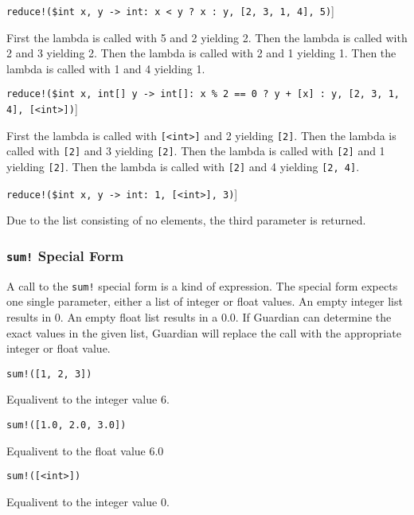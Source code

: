 {{\begin{itemize}
{			\item[] \texttt{reduce!(\$int x, y -> int: x < y ? x : y, [2, 3, 1, 4], 5)}]
			
				First the lambda is called with 5 and 2 yielding 2.
				Then the lambda is called with 2 and 3 yielding 2.
				Then the lambda is called with 2 and 1 yielding 1.
				Then the lambda is called with 1 and 4 yielding 1.
				
			\item[] \texttt{reduce!(\$int x, int[] y -> int[]: x \% 2 == 0 ? y + [x] : y, [2, 3, 1, 4], [<int>])}]
			
				First the lambda is called with \texttt{[<int>]} and 2 yielding \texttt{[2]}.
				Then the lambda is called with \texttt{[2]} and 3 yielding \texttt{[2]}.
				Then the lambda is called with \texttt{[2]} and 1 yielding \texttt{[2]}.
				Then the lambda is called with \texttt{[2]} and 4 yielding \texttt{[2, 4]}.
				
			\item[] \texttt{reduce!(\$int x, y -> int: 1, [<int>], 3)}]
			
				Due to the list consisting of no elements, the third parameter
				is returned.
		}
		\end{itemize}
	}
	
	\subsubsection{\texttt{sum!} Special Form}
	{
		A call to the \texttt{sum!} special form is a kind of expression.
		The special form expects one single parameter, either a list of integer
		or float values. An empty integer list results in 0. An empty float list
		results in a 0.0.
		If Guardian can determine the exact values in the given list, Guardian
		will replace the call with the appropriate integer or float value.
		
		\begin{itemize}
		{
			\item[] \texttt{sum!([1, 2, 3])}
			
				Equalivent to the integer value 6.
			
			\item[] \texttt{sum!([1.0, 2.0, 3.0])}
			
				Equalivent to the float value 6.0
			
			\item[] \texttt{sum!([<int>])}
			
				Equalivent to the integer value 0.
		}
		\end{itemize}
	}
}






















